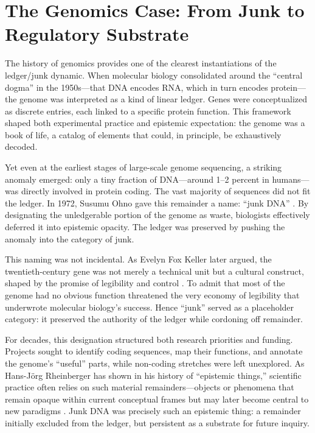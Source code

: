 \documentclass[12pt]{article}
\begin{document}
\section{The Genomics Case: From Junk to Regulatory Substrate}

The history of genomics provides one of the clearest instantiations of the ledger/junk dynamic. When molecular biology consolidated around the ``central dogma'' in the 1950s---that DNA encodes RNA, which in turn encodes protein---the genome was interpreted as a kind of linear ledger. Genes were conceptualized as discrete entries, each linked to a specific protein function. This framework shaped both experimental practice and epistemic expectation: the genome was a book of life, a catalog of elements that could, in principle, be exhaustively decoded.

Yet even at the earliest stages of large-scale genome sequencing, a striking anomaly emerged: only a tiny fraction of DNA---around 1--2 percent in humans---was directly involved in protein coding. The vast majority of sequences did not fit the ledger. In 1972, Susumu Ohno gave this remainder a name: ``junk DNA'' \citep{ohno1972}. By designating the unledgerable portion of the genome as waste, biologists effectively deferred it into epistemic opacity. The ledger was preserved by pushing the anomaly into the category of junk.

This naming was not incidental. As Evelyn Fox Keller later argued, the twentieth-century gene was not merely a technical unit but a cultural construct, shaped by the promise of legibility and control \citep{keller2000}. To admit that most of the genome had no obvious function threatened the very economy of legibility that underwrote molecular biology’s success. Hence ``junk'' served as a placeholder category: it preserved the authority of the ledger while cordoning off remainder.

For decades, this designation structured both research priorities and funding. Projects sought to identify coding sequences, map their functions, and annotate the genome’s ``useful'' parts, while non-coding stretches were left unexplored. As Hans-Jörg Rheinberger has shown in his history of ``epistemic things,'' scientific practice often relies on such material remainders---objects or phenomena that remain opaque within current conceptual frames but may later become central to new paradigms \citep{rheinberger1997}. Junk DNA was precisely such an epistemic thing: a remainder initially excluded from the ledger, but persistent as a substrate for future inquiry.
\end{document}
